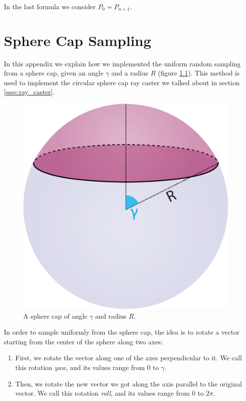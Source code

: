 \documentclass{PoliMi_MasterThesis}
\begin{document}
In the last formula we consider $P_0 = P_{n+1}$.

\chapter{Sphere Cap Sampling} \label{ch:sphere_cap_sampling}
In this appendix we explain how we implemented the uniform random sampling from a sphere cap, given an angle $\gamma$ and a radius $R$ (figure \ref{fig:sphere_cap}). This method is used to implement the circular sphere cap ray caster we talked about in section \ref{ssec:ray_caster}.

\begin{figure}[H]
    \centering
    \includegraphics[width=\textwidth*\real{0.35}]{Images/sphere_cap.png} 
    \caption{A sphere cap of angle $\gamma$ and radius $R$.}
    \label{fig:sphere_cap}
\end{figure}

In order to sample uniformly from the sphere cap, the idea is to rotate a vector starting from the center of the sphere along two axes:
\begin{enumerate}
	\item First, we rotate the vector along one of the axes perpendicular to it. We call this rotation \textit{yaw}, and its values range from $0$ to $\gamma$.
	\item Then, we rotate the new vector we got along the axis parallel to the original vector. We call this rotation \textit{roll}, and its values range from $0$ to $2\pi$.
\end{enumerate}
\end{document}
